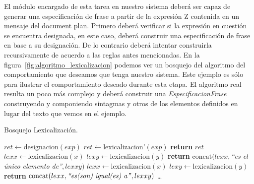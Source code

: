 El módulo encargado de esta tarea en nuestro sistema deberá ser capaz de generar una especificación de frase a partir de la expresión Z contenida en un mensaje del document plan. Primero deberá verificar si la expresión en cuestión se encuentra designada, en este caso, deberá construir una especificación de frase en base a su designación. De lo contrario deberá intentar construirla recursivamente de acuerdo a las reglas antes mencionadas. En la figura~\ref{fig:algoritmo_lexicalizacion} podemos ver un bosquejo del algoritmo del comportamiento que deseamos que tenga nuestro sistema. Este ejemplo es sólo para ilustrar el comportamiento deseado durante esta etapa. El algoritmo real resulta un poco más complejo y deberá construir una \emph{EspecificacionFrase} construyendo y componiendo sintagmas y otros de los elementos definidos en lugar del texto que vemos en el ejemplo. 

\begin{algorithm}[H]
\caption{Bosquejo Lexicalización.}
\begin{algorithmic}
\State $ret\gets \text{designacion}(exp)$
\Else
\State $ret\gets \text{lexicalizacion'}(exp)$
\EndIf
\State \textbf{return} $ret$
\EndFunction
\Statex
{}
\State $lexx\gets \text{lexicalizacion}(x)$
\State $lexy\gets \text{lexicalizacion}(y)$
\State \textbf{return} $\text{concat}(lexx, $\emph{``es el único elemento de''}$, lexxy)$
\EndFunction
\Statex
{}
\State $lexx\gets \text{lexicalizacion}(x)$
\State $lexy\gets \text{lexicalizacion}(y)$
\State \textbf{return} $\text{concat}(lexx, \text{\emph{``es(son) igual(es) a''}}, lexxy)$
\EndFunction
\Statex
\ldots
\end{algorithmic}
\label{fig:algoritmo_lexicalizacion}
\end{algorithm}

